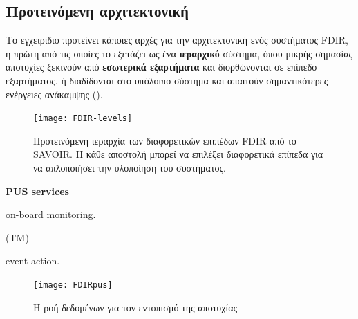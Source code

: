 \documentclass[a4paper,nobib]{tufte-book}
\begin{document}
\subsection{Προτεινόμενη αρχιτεκτονική}

Το εγχειρίδιο προτείνει κάποιες αρχές για την αρχιτεκτονική ενός συστήματος \acs{FDIR}, η πρώτη από τις οποίες το εξετάζει ως ένα \textbf{ιεραρχικό} σύστημα, όπου μικρής σημασίας αποτυχίες ξεκινούν από \textbf{εσωτερικά εξαρτήματα} και διορθώνονται σε επίπεδο εξαρτήματος, ή διαδίδονται στο υπόλοιπο σύστημα και απαιτούν σημαντικότερες ενέργειες ανάκαμψης ().

\begin{figure}
	\texttt{[image: FDIR-levels]}
	\caption[Προτεινόμενη ιεραρχία των διαφορετικών επιπέδων FDIR από το SAVOIR]{Προτεινόμενη ιεραρχία των διαφορετικών επιπέδων \acs{FDIR} από το \acs{SAVOIR}. Η κάθε αποστολή μπορεί να επιλέξει διαφορετικά επίπεδα για να απλοποιήσει την υλοποίηση του συστήματος.}
	\label{fig:FDIR-levels}
\end{figure}

 \textbf{\acs{PUS} services} 
\begin{compactenum}
	\item {}
	\item {} on-board monitoring. 
	\item {} (\acs{TM}) 
	\item {} event-action.
	\item {}
\end{compactenum}

\begin{figure}[h]
	\texttt{[image: FDIRpus]}
	\caption{Η ροή δεδομένων για τον εντοπισμό της αποτυχίας}
	\label{fig:fdirpus}
\end{figure}
\end{document}
